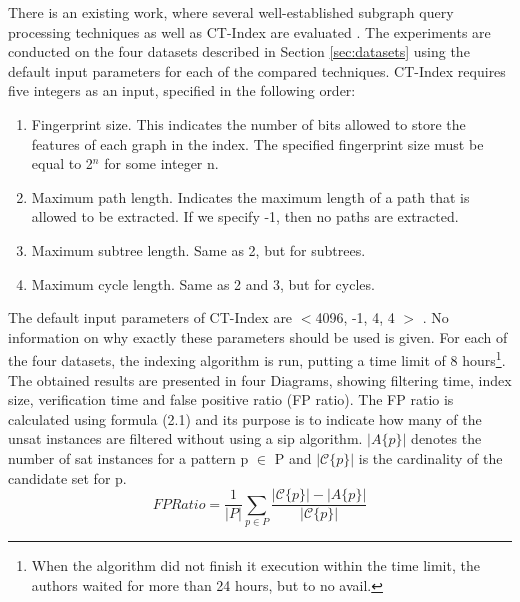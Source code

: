 \documentclass{l4proj}
\newcommand{\fancyC}{\mathcal{C}}
\begin{document}
There is an existing work, where several well-established subgraph query processing techniques as well as CT-Index are evaluated \cite{foteini}. The experiments are conducted on the four datasets described in Section \ref{sec:datasets} using the default input parameters for each of the compared techniques. CT-Index requires five integers as an input, specified in the following order:
\begin{enumerate}
\item Fingerprint size. This indicates the number of bits allowed to store the features of each graph in the index. The specified fingerprint size must be equal to 2$^{n}$ for some integer n.
\item Maximum path length. Indicates the maximum length of a path that is allowed to be extracted. If we specify -1, then no paths are extracted.
\item Maximum subtree length. Same as 2, but for subtrees.
\item Maximum cycle length. Same as 2 and 3, but for cycles.
\end{enumerate}

The default input parameters of CT-Index are $<$4096, -1, 4, 4 $>$ \cite{ctindex, foteini}. No information on why exactly these parameters should be used is given. For each of the four datasets, the indexing algorithm is run, putting a time limit of 8 hours\footnote{When the algorithm did not finish it execution within the time limit, the authors waited for more than 24 hours, but to no avail.}. The obtained results are presented in four Diagrams, showing filtering time, index size, verification time and false positive ratio (FP ratio). The FP ratio is calculated using formula (2.1) and its purpose is to indicate how many of the \gls{unsat} instances are filtered without using a \gls{sip} algorithm. \textit{$|A\{p\}|$} denotes the number of \gls{sat} instances for a pattern p $\in$ P and \textit{$|\fancyC\{p\}|$} is the cardinality of the candidate set for p.
\begin{equation}
\label{eq:fpratio}
FP Ratio = \frac{1}{|P|} \sum_{p \in P} \frac{|\fancyC\{p\}| - |A\{p\}|}{|\fancyC\{p\}|}
\end{equation}
\end{document}
